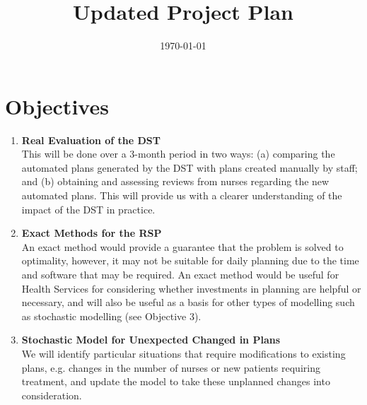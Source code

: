 \documentclass[a4paper]{article}
\begin{document}
\title{Updated Project Plan}
\date{\today}
\maketitle

\section*{Objectives}
\begin{enumerate}[leftmargin=*]
	\item \textbf{Real Evaluation of the DST}\\
	This will be done over a 3-month period in two ways: (a) comparing the automated plans generated by the DST with plans created manually by staff; and (b) obtaining and assessing reviews from nurses regarding the new automated plans. This will provide us with a clearer understanding of the impact of the DST in practice.
	\item \textbf{Exact Methods for the RSP}\\
	An exact method would provide a guarantee that the problem is solved to optimality, however, it may not be suitable for daily planning due to the time and software that may be required. An exact method would be useful for Health Services for considering whether investments in planning are helpful or necessary, and will also be useful as a basis for other types of modelling such as stochastic modelling (see Objective 3).
	\item \textbf{Stochastic Model for Unexpected Changed in Plans}\\
	We will identify particular situations that require modifications to existing plans, e.g. changes in the number of nurses or new patients requiring treatment, and update the model to take these unplanned changes into consideration.
\end{enumerate}	

\end{document}

